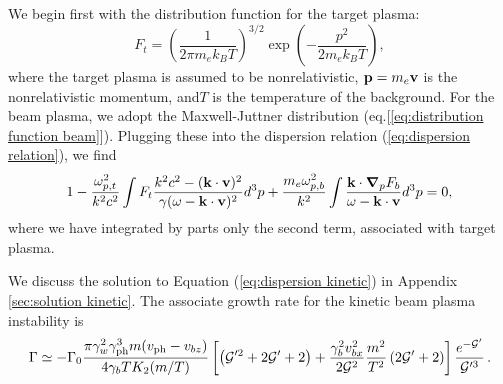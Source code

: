 \documentclass[usenatbib,iop,apj,numberedappendix]{aeb_emulateapj_2010}
\newcommand\bmath[1] {\mbox{\boldmath$\rm #1$}}
\def\gph{\gamma_{\rm ph}}
\def\vph{v_{\rm ph}}
\def\cG{\mathcal{G}}
\newcommand{\vel}{\ensuremath{\bmath{v}}}
\newcommand{\pmom}{\ensuremath{\bmath{p}}}
\newcommand{\gradp}{\ensuremath{\bmath{\nabla}_p}}
\newcommand{\betavec}{\ensuremath{\bmath{\beta}}}
\newcommand{\kvec}{\ensuremath{\bmath{k}}}
\newcommand{\betabeam}{\ensuremath{\bmath{\beta}_{\rm b}}}
\newcommand{\gammabeam}{\ensuremath{\gamma_{\rm b}}}
\begin{document}
We begin first with the distribution function for the target plasma:
\begin{equation}
 F_t = \left(\frac{1}{2\pi m_e k_B T}\right)^{3/2}\exp\left(-\frac{p^2}{2m_e k_B T}\right),
\end{equation}
where the target plasma is assumed to be nonrelativistic, $\bmath{p}=m_e\vel$ is the nonrelativistic momentum,  and$T$ is the temperature of the background.
For the beam plasma, we adopt the Maxwell-Juttner distribution (eq.[\ref{eq:distribution function beam}]).
Plugging these into the dispersion relation (\ref{eq:dispersion relation}), we find
\begin{equation}\label{eq:dispersion kinetic}
 1 - \frac{\omega_{p,t}^2}{k^2c^2}\int F_t\frac{k^2c^2 - (\kvec\cdot\vel)^2}{\gamma(\omega - \kvec\cdot\vel)^2} d^3p + \frac{m_e\omega_{p,b}^2}{k^2}\int \frac{\kvec\cdot\gradp F_b}{\omega - \kvec\cdot\vel}d^3p  = 0,
\end{equation}
where we have integrated by parts only the second term, associated with target plasma.  

We discuss the solution to Equation (\ref{eq:dispersion kinetic}) in Appendix \ref{sec:solution kinetic}.  The associate growth rate for the kinetic beam plasma instability is  
\begin{equation}
\Gamma \simeq - \Gamma_0
\frac{\pi \gamma_w^2 \gph^3 m (\vph-v_{bz})}{4 \gamma_b T K_2(m/T)}
\left[
\left( \cG'^2 + 2\cG' + 2 \right) 
+
\frac{\gamma_b^2 v_{bx}^2}{2\cG^2} \frac{m^2}{T^2} \left(2 \cG' + 2\right)
\right]
\frac{e^{-\cG'}}{\cG'^3}\,.
\label{eq:OGgen}
\end{equation}
\end{document}
